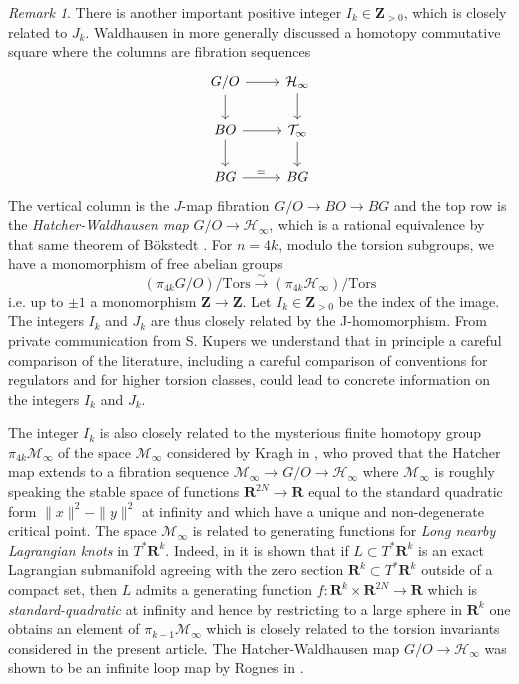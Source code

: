 \documentclass{amsart}
\newcommand\cH{\mathcal{H}}
\newcommand\cM{\mathcal{M}}
\newcommand\cT{\mathcal{T}}
\def\bR{\mathbf{R}}
\def\bZ{\mathbf{Z}}
\theoremstyle{definition}
\theoremstyle{remark}
\newtheorem{inductive lemma}[theorem]{Inductive Lemma}
\newtheorem{remark}[theorem]{Remark}
\begin{document}
\begin{remark}
There is another important positive integer $I_k \in \bZ_{>0}$, which is closely related to $J_k$. Waldhausen in \cite{W82} more generally discussed a homotopy commutative square where the columns are fibration sequences
$$
\begin{tikzcd}  G/ O\ar[r] \ar[d] & \cH_\infty \ar[d] \\
BO \ar[r] \ar[d] & \cT_\infty  \ar[d]\\
BG \ar[r,"="] & BG 
\end{tikzcd} $$
The vertical column is the $J$-map fibration $G/O \to BO \to BG$ and the top row is the {\em Hatcher-Waldhausen map} $G/O \to \cH_\infty$, which is a rational equivalence by that same theorem of B\"okstedt  \cite{B82}. For $n=4k$, modulo the torsion subgroups, we have a monomorphism of free abelian groups
$$(\pi_{4k} G/O) / \text{Tors} \xrightarrow{\sim} (\pi_{4k} \cH_\infty) / \text{Tors} $$ 
i.e.  up to $\pm 1$ a monomorphism $\bZ \to \bZ$. Let $I_k \in \bZ_{>0}$ be the index of the image. The integers $I_k$ and $J_k$ are thus closely related by the J-homomorphism. From private communication from S. Kupers we understand that in principle a careful comparison of the literature, including a careful comparison of conventions for regulators and for higher torsion classes, could lead to concrete information on the integers $I_k$ and $J_k$. 

The integer $I_k$ is also closely related to the mysterious finite homotopy group $\pi_{4k}\cM_\infty$ of the space $\cM_\infty$ considered by Kragh in \cite{Kra18}, who proved that the Hatcher map extends to a fibration sequence $\cM_\infty \to G/O \to \cH_\infty$ where $\cM_\infty$ is roughly speaking the stable space of functions $\bR^{2N} \to \bR$ equal to the standard quadratic form $\|x\|^2-\|y\|^2$ at infinity and which have a unique and non-degenerate critical point. The space $\cM_\infty$ is related to generating functions for {\em Long nearby Lagrangian knots} in $T^*\bR^k$.  Indeed, in \cite{Kra18} it is shown that if $L \subset T^*\bR^k$ is an exact Lagrangian submanifold agreeing with the zero section $\bR^k \subset T^*\bR^k$ outside of a compact set, then $L$ admits a generating function $f:\bR^k \times \bR^{2N} \to \bR$ which is {\em standard-quadratic} at infinity and hence by restricting to a large sphere in $\bR^k$ one obtains an element of $\pi_{k-1} \cM_\infty$ which is closely related to the torsion invariants considered in the present article. The Hatcher-Waldhausen map $G/O \to \cH_\infty$ was shown to be an infinite loop map by Rognes in \cite{R92}.
\end{remark}
\end{document}
